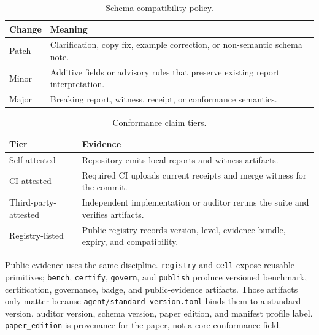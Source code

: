 \begin{table}[t]
\caption{Schema compatibility policy.}
\label{tab:schema-compat}
\centering
\small
\begin{tabularx}{\columnwidth}{L{0.18\columnwidth} Y}
\toprule
\textbf{Change} & \textbf{Meaning} \\
\midrule
Patch & Clarification, copy fix, example correction, or non-semantic schema note. \\
Minor & Additive fields or advisory rules that preserve existing report interpretation. \\
Major & Breaking report, witness, receipt, or conformance semantics. \\
\bottomrule
\end{tabularx}
\end{table}

\begin{table}[t]
\caption{Conformance claim tiers.}
\label{tab:claim-tiers}
\centering
\small
\begin{tabularx}{\columnwidth}{L{0.30\columnwidth} Y}
\toprule
\textbf{Tier} & \textbf{Evidence} \\
\midrule
Self-attested & Repository emits local reports and witness artifacts. \\
CI-attested & Required CI uploads current receipts and merge witness for the commit. \\
Third-party-attested & Independent implementation or auditor reruns the suite and verifies artifacts. \\
Registry-listed & Public registry records version, level, evidence bundle, expiry, and compatibility. \\
\bottomrule
\end{tabularx}
\end{table}

Public evidence uses the same discipline. \texttt{registry} and \texttt{cell} expose reusable primitives; \texttt{bench}, \texttt{certify}, \texttt{govern}, and \texttt{publish} produce versioned benchmark, certification, governance, badge, and public-evidence artifacts. Those artifacts only matter because \texttt{agent/standard-version.toml} binds them to a standard version, auditor version, schema version, paper edition, and manifest profile label. \texttt{paper\_edition} is provenance for the paper, not a core conformance field.

